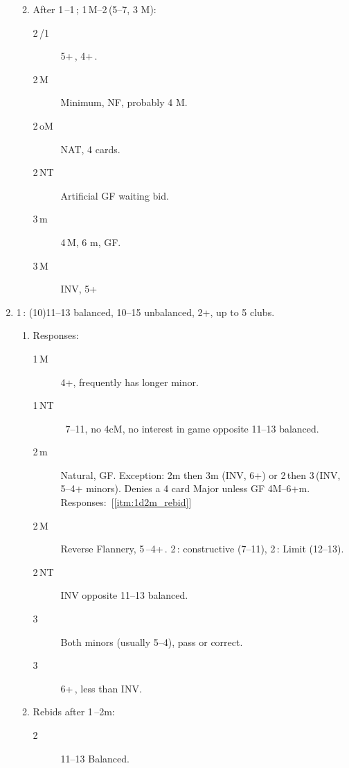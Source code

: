 \documentclass[12pt]{article}
\begin{document}
\begin{footnotesize}
\begin{enumerate}
\begin{enumerate}[label*=\arabic*,nosep]
\begin{description}
            \end{description}
            \item \label{itm:1c1d1M2d_rebid} After 1\,\bc--1\,\rd; 1\,M--2\,\rd (5--7, 3 M):
            \begin{description}
                \item [2\,\rh/1\,\bs] 5+\,\bs, 4+\,\rh.
                \item [2\,M] Minimum, NF, probably 4 M\@.
                \item [2\,oM] NAT, 4 cards.
                \item [2\,NT] Artificial GF waiting bid.
                \item [3\,m] 4\,M, 6 m, GF\@.
                \item [3\,M] INV, 5+
            \end{description}
        \end{enumerate}
        \item 1\,\rd: (10)11--13 balanced, 10--15 unbalanced, 2+\rd, up to 5 clubs.
        \begin{enumerate}[label*=\arabic*,nosep]
            \item \label{itm:1d_resp} Responses:
            \begin{description}
                \item [1\,M] 4+, frequently has longer minor.
                \item [1\,NT] ~7--11, no 4cM, no interest in game opposite 11--13 balanced.
                \item [2\,m] Natural, GF\@.
                    Exception: 2m then 3m (INV, 6+) or 2\,\rd then 3\,\bc (INV, 5--4+ minors).
                    Denies a 4 card Major unless GF 4M--6+m.
                    Responses:~[\ref{itm:1d2m_rebid}]
                \item [2\,M] Reverse Flannery, 5\,\bs--4+\,\rh.
                    2\,\rh: constructive (7--11), 2\,\bs: Limit (12--13).
                \item [2\,NT] INV opposite 11--13 balanced.
                \item [3\,\bc] Both minors (usually 5--4), pass or correct.
                \item [3\,\rd] 6+\,\rd, less than INV\@.
            \end{description}
            \item \label{itm:1d2m_rebid} Rebids after 1\,\rd--2m:
            \begin{description}
                \item [2\,\rh] 11--13 Balanced.

\end{description}
\end{enumerate}
\end{enumerate}
\end{footnotesize}
\end{document}
